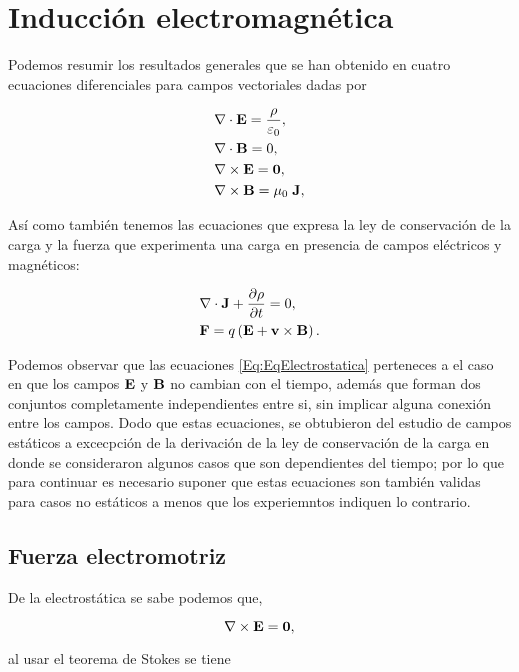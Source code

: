 \chapter{Inducción electromagnética}
Podemos resumir los resultados generales que se han obtenido en cuatro ecuaciones diferenciales para campos vectoriales dadas por

\begin{align}
	\label{Eq:EqElectrostatica}
		 & \nabla \cdot \textbf{E} = \frac{\rho}{\varepsilon_{0}}, \\
		 & \nabla \cdot \textbf{B} = 0,                            \\
		 & \nabla \times \textbf{E} = \textbf{0},                   \\
		 & \nabla \times \textbf{B} = \mu_{0}\; \textbf{J},
\end{align}

Así como también tenemos las ecuaciones que expresa la ley de conservación de la carga y la fuerza que experimenta una carga en presencia de campos eléctricos y magnéticos:

\begin{align}
	 & \divergence{\textbf{J}} + \diffp{\rho}{t} = 0,           \\
	 & \textbf{F} = q \left( \E + \textbf{v} \times \B \right).
\end{align}

Podemos observar que las ecuaciones \eqref{Eq:EqElectrostatica} perteneces a el caso en que los campos $\textbf{E}$ y $\textbf{B}$ no cambian con el tiempo, además que forman dos conjuntos completamente independientes entre si, sin implicar alguna conexión entre los campos. Dodo que estas ecuaciones, se obtubieron del estudio de campos estáticos a excecpción de la derivación de la ley de conservación de la carga en donde se consideraron algunos casos que son dependientes del tiempo; por lo que para continuar es necesario suponer que estas ecuaciones son también validas para casos no estáticos a menos que los experiemntos indiquen lo contrario.

\section{Fuerza electromotriz}
De la electrostática se sabe podemos que,

\begin{equation*}
	\nabla \times \textbf{E} = \textbf{0},
\end{equation*}

al usar el teorema de Stokes se tiene

